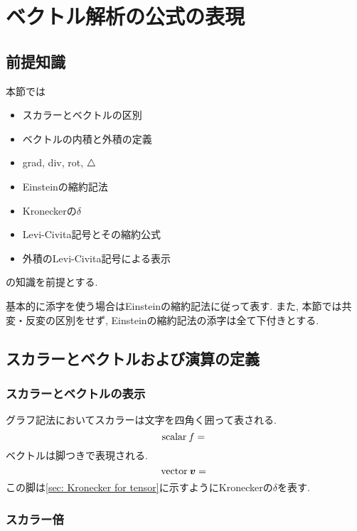 \documentclass[dvipdfmx]{jsarticle}
\begin{document}
\section{ベクトル解析の公式の表現}
\label{sec: vector}

\subsection{前提知識}

本節では
\begin{itemize}
    \item スカラーとベクトルの区別
    \item ベクトルの内積と外積の定義
    \item grad, div, rot, $\triangle$
    \item Einsteinの縮約記法
    \item Kroneckerの$\delta$
    \item Levi-Civita記号とその縮約公式
    \item 外積のLevi-Civita記号による表示
\end{itemize}
の知識を前提とする.

基本的に添字を使う場合はEinsteinの縮約記法に従って表す.
また, 本節では共変・反変の区別をせず, Einsteinの縮約記法の添字は全て下付きとする.


\subsection{スカラーとベクトルおよび演算の定義}

\subsubsection{スカラーとベクトルの表示}

グラフ記法においてスカラーは文字を四角く囲って表される.
\begin{equation*}
    \text{scalar}\:f=\vcenter{\hbox{}}
\end{equation*}
ベクトルは脚つきで表現される.
\begin{equation*}
    \text{vector}\:\bm{v}=\vcenter{\hbox{}}
\end{equation*}
この脚は\ref{sec: Kronecker for tensor}に示すようにKroneckerの$\delta$を表す.


\subsubsection{スカラー倍}
\end{document}

